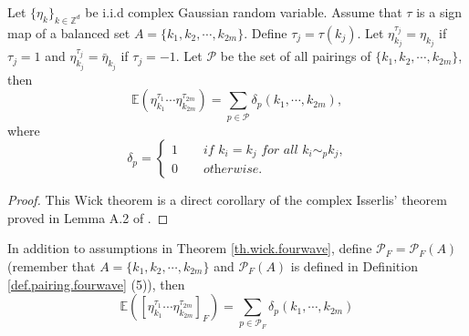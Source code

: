  
 \begin{thm}\label{th.wick.fourwave}
 Let $\{\eta_k\}_{k\in\mathbb{Z}^d}$ be i.i.d complex Gaussian random variable. Assume that $\tau$ is a sign map of a balanced set $A=\{k_1,k_2,\cdots,k_{2m}\}$. Define $\tau_{j}=\tau(k_j)$. Let $\eta_{k_j}^{\tau_j}=\eta_{k_j}$ if $\tau_j=1$ and $\eta_{k_j}^{\tau_j}=\bar{\eta}_{k_j}$ if $\tau_j=-1$. %
 Let $\mathcal{P}$ be the set of all pairings of $\{k_1,k_2,\cdots,k_{2m}\}$, then
 \begin{equation}
  \mathbb{E}(\eta^{\tau_1}_{k_1}\cdots \eta^{\tau_{2m}}_{k_{2m}})=\sum_{p\in \mathcal{P}} \delta_{p}(k_1,\cdots,k_{2m}), 
 \end{equation}
 where 
 \begin{equation}\label{eq.deltapairing.fourwave}
 \delta_{p}=\begin{cases}
 1\qquad \textit{if $k_{i}=k_{j}$ for all $k_{i}\sim_{p}k_{j}$,}
 \\
 0\qquad \textit{otherwise.}
 \end{cases}
 \end{equation}
 \end{thm}
 \begin{proof}
 This Wick theorem is a direct corollary of the complex Isserlis' theorem proved in Lemma A.2 of \cite{deng2021full}.
 \end{proof}
 
 \begin{thm}\label{th.wickr.fourwave} In addition to assumptions in Theorem \ref{th.wick.fourwave}, define $\mathcal{P}_F=\mathcal{P}_F(A)$ (remember that $A=\{k_1,k_2,\cdots,k_{2m}\}$ and $\mathcal{P}_F(A)$ is defined in Definition \ref{def.pairing.fourwave} (5)), then 
 \begin{equation}
  \mathbb{E}([\eta^{\tau_1}_{k_1}\cdots \eta^{\tau_{2m}}_{k_{2m}}]_F)=\sum_{p\in \mathcal{P}_F} \delta_{p}(k_1,\cdots,k_{2m})
 \end{equation}
 \end{thm}
 
